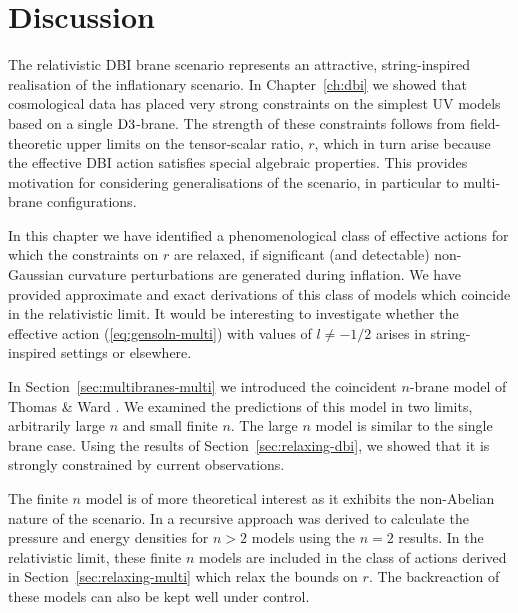 % 
% 
% 
\section{Discussion}
\label{sec:disc-multi}


The relativistic DBI brane scenario represents an attractive, 
string-inspired realisation of the inflationary scenario. In
Chapter~\ref{ch:dbi} we showed that
cosmological data has placed very strong constraints on the simplest 
UV models based on a single ${\rm D3}$-brane. The strength 
of these constraints follows from field-theoretic upper limits 
on the tensor-scalar ratio, $r$, which in turn arise because 
the effective DBI action satisfies special  
algebraic properties. This provides motivation 
for considering generalisations of the scenario, in particular to 
multi-brane configurations. 


In this chapter we have identified a phenomenological class of 
effective actions for which the constraints 
on $r$ are relaxed, if significant (and detectable) 
non-Gaussian curvature perturbations are generated during inflation. 
We have provided approximate and exact derivations of this class of models which coincide
in the relativistic limit. It would be interesting to 
investigate whether the effective action (\ref{eq:gensoln-multi}) with values
of $l \ne - 1/2$ arises in string-inspired settings or elsewhere.

In Section~\ref{sec:multibranes-multi} we introduced the coincident $n$-brane
model of Thomas \& Ward \cite{thomasward}. We examined the predictions of this
model in two limits, arbitrarily large $n$ and small finite $n$. The large $n$
model
is similar to the single brane case. Using the results of
Section~\ref{sec:relaxing-dbi}, we showed that it is strongly
constrained by current observations.

The finite $n$ model is of more theoretical interest as it exhibits the
non-Abelian nature of the scenario. In  a recursive approach was
derived to calculate the pressure and energy densities for $n>2$ models using
the $n=2$ results. In the relativistic limit, these finite $n$ models are
included in the class of actions derived in Section~\ref{sec:relaxing-multi}
which relax the bounds on $r$. The backreaction of these models can also be
kept well under control.


